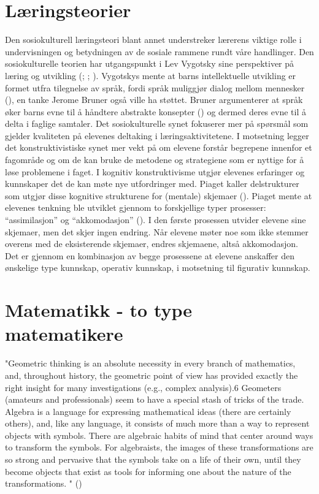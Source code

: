 \documentclass[12pt,twoside,onecolumn,norsk]{article}
\begin{document}
\section*{Læringsteorier}
Den sosiokulturell læringsteori blant annet understreker lærerens viktige rolle i undervisningen
og betydningen av de sosiale rammene rundt våre handlinger.
Den sosiokulturelle teorien har utgangspunkt 
i Lev Vygotsky sine perspektiver på læring og utvikling (; ; 
). Vygotskys mente at barns 
intellektuelle utvikling er formet utfra tilegnelse av språk, fordi språk muliggjør dialog mellom 
mennesker (), en tanke Jerome Bruner også ville ha støttet. Bruner argumenterer 
at språk øker barns evne til å håndtere abstrakte konsepter () og dermed deres evne til å 
delta i faglige samtaler. Det sosiokulturelle synet fokuserer mer på spørsmål som gjelder
kvaliteten på elevenes deltaking i læringsaktivitetene. I motsetning legger det konstruktivistiske 
synet mer vekt på om elevene forstår begrepene innenfor et fagområde og om de kan bruke de metodene og
strategiene som er nyttige for å løse problemene i faget.
\newline
\newline
I kognitiv konstruktivisme utgjør elevenes erfaringer og kunnskaper det de kan møte nye 
utfordringer med. Piaget kaller delstrukturer som utgjør disse kognitive strukturene 
for (mentale) skjemaer (). Piaget mente at elevenes tenkning ble 
utviklet gjennom to forskjellige typer prosesser: ``assimilasjon'' og ``akkomodasjon'' 
(). I den første prosessen utvider elevene sine skjemaer, men
det skjer ingen endring. Når elevene møter noe som ikke stemmer overens med de
eksisterende skjemaer, endres skjemaene, altså akkomodasjon. Det er gjennom en 
kombinasjon av begge prosessene at elevene anskaffer den ønskelige type kunnskap,
operativ kunnskap, i motsetning til figurativ kunnskap.

\section*{Matematikk - to type matematikere}
"Geometric thinking is an absolute necessity in every branch of mathematics, and,
throughout history, the geometric point of view has provided exactly the right
insight for many investigations (e.g., complex analysis).6 Geometers (amateurs
and professionals) seem to have a special stash of tricks of the trade. 
\newline
\newline
Algebra is a language for expressing mathematical ideas (there are certainly
others), and, like any language, it consists of much more than a way to represent
objects with symbols. There are algebraic habits of mind that center around ways
to transform the symbols. For algebraists, the images of these transformations
are so strong and pervasive that the symbols take on a life of their own, until they
become objects that exist as tools for informing one about the nature of the
transformations. " ()
\end{document}
